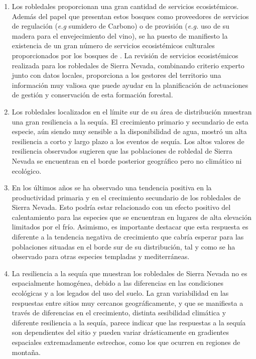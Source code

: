 \begin{enumerate}
    \item Los robledales proporcionan una gran cantidad de servicios ecosistémicos. Además del papel que presentan estos bosques como proveedores de servicios de regulación (\emph{e.g} sumidero de Carbono) o de provisión (\emph{e.g.} uso de su madera para el envejecimiento del vino), se ha puesto de manifiesto la existencia de un gran número de servicios ecosistémicos culturales proporcionados por los bosques de \Qp. La revisión de servicios ecosistémicos realizada para los robledales de Sierra Nevada, combinando criterio experto junto con datos locales, proporciona a los gestores del territorio una información muy valiosa que puede ayudar en la planificación de actuaciones de gestión y conservación de esta formación forestal. 
    
    \item Los robledales localizados en el límite sur de su área de distribución muestran una gran resiliencia a la sequía. El crecimiento primario y secundario de esta especie, aún siendo muy sensible a la disponibilidad de agua, mostró un alta resiliencia a corto y largo plazo a los eventos de sequía. Los altos valores de resiliencia observados sugieren que las poblaciones de robledal de Sierra Nevada se encuentran en el borde posterior geográfico pero no climático ni ecológico. 
    
    \item En los últimos años se ha observado una tendencia positiva en la productividad primaria y en el crecimiento secundario de los robledales de Sierra Nevada. Esto podría estar relacionado con un efecto positivo del calentamiento para las especies que se encuentran en lugares de alta elevación limitados por el frío. Asimismo, es importante destacar que esta respuesta es diferente a la tendencia negativa de crecimiento que cabría esperar para las poblaciones situadas en el borde sur de su distribución, tal y como se ha observado para otras especies templadas y mediterráneas. 
    
    \item La resiliencia a la sequía que muestran los robledales de Sierra Nevada no es espacialmente homogénea, debido a las diferencias en las condiciones ecológicas y a los legados del uso del suelo. La gran variabilidad en las respuestas entre sitios muy cercanos geográficamente, y que se manifiesta a través de diferencias en el crecimiento, distinta sesibilidad climática y diferente resiliencia a la sequía, parece indicar que las respuestas a la sequía son dependientes del sitio y pueden variar drásticamente en gradientes espaciales extremadamente estrechos, como los que ocurren en regiones de montaña. 
    

\end{enumerate}
